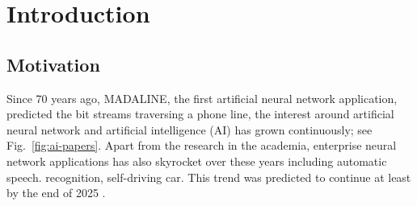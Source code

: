 \section{Introduction}

\subsection{Motivation}


Since 70 years ago, MADALINE\cite{adaline}, the first artificial neural network application, predicted the bit streams traversing a phone line, the interest around artificial neural network and artificial intelligence (AI) has grown continuously; see Fig.~\ref{fig:ai-papers}. Apart from the research in the academia, enterprise neural network applications has also skyrocket over these years including automatic speech. recognition\cite{yu2016automatic}, self-driving car\cite{maqueda2018event}. This trend was predicted to continue at least by the end of 2025 \cite{ai-invest}. \\

